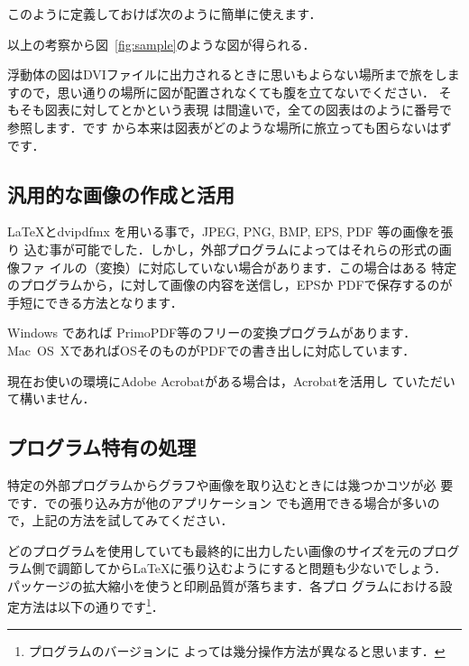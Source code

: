 このように定義しておけば次のように簡単に使えます．

\begin{intext}
以上の考察から図~\ref{fig:sample}のような図が得られる．
\end{intext}

浮動体の図はDVIファイルに出力されるときに思いもよらない場所まで旅をしま
すので，思い通りの場所に図が配置されなくても腹を立てないでください．
そもそも図表に対してとかという表現
は間違いで，全ての図表はのように番号で参照します．です
から本来は図表がどのような場所に旅立っても困らないはずです．


\subsection{汎用的な画像の作成と活用}

\LaTeX とdvipdfmx を用いる事で，JPEG, PNG, BMP, EPS, PDF 等の画像を張り
込む事が可能でした．しかし，外部プログラムによってはそれらの形式の画像ファ
イルの（変換）に対応していない場合があります．この場合はある
特定のプログラムから，に対して画像の内容を送信し，EPSか
PDFで保存するのが手短にできる方法となります．

Windows であれば {PrimoPDF}等のフリーの変換プログラムがあります．
Mac~OS~XであればOSそのものがPDFでの書き出しに対応しています．%

現在お使いの環境に{Adobe Acrobat}がある場合は，Acrobatを活用し
ていただいて構いません．

\subsection{プログラム特有の処理}

特定の外部プログラムからグラフや画像を取り込むときには幾つかコツが必
要です．での張り込み方が他のアプリケーション
でも適用できる場合が多いので，上記の方法を試してみてください．

どのプログラムを使用していても最終的に出力したい画像のサイズを元のプログ
ラム側で調節してから{\LaTeX}に張り込むようにすると問題も少ないでしょう．
パッケージの拡大縮小を使うと印刷品質が落ちます．各プロ
グラムにおける設定方法は以下の通りです\footnote{プログラムのバージョンに
よっては幾分操作方法が異なると思います．}．

